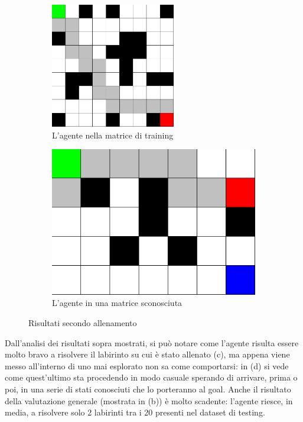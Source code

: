 \begin{figure}[H]
	\ \\
	\begin{subfigure}[t]{.5\textwidth}
		\centering
		\includegraphics[width=0.6\textwidth]{img/secondo_train_success.png}
		\caption{L'agente nella matrice di training}
	\end{subfigure}%
	\begin{subfigure}[t]{.5\textwidth}
		\centering
		\includegraphics[width=.8\textwidth]{img/secondo_train_fail.png}
		\caption{L'agente in una matrice sconosciuta}
	\end{subfigure}%
	\caption{Risultati secondo allenamento}
\end{figure}

Dall'analisi dei risultati sopra mostrati, si pu\`{o} notare come l'agente risulta essere molto bravo a risolvere il labirinto su cui \`{e} stato allenato (c), ma appena viene messo all'interno di uno mai esplorato non sa come comportarsi: in (d) si vede come quest'ultimo sta procedendo in modo casuale sperando di arrivare, prima o poi, in una serie di stati conosciuti che lo porteranno al goal. Anche il risultato della valutazione generale (mostrata in (b)) \`{e} molto scadente: l'agente riesce, in media, a risolvere solo 2 labirinti tra i 20 presenti nel dataset di testing.%

